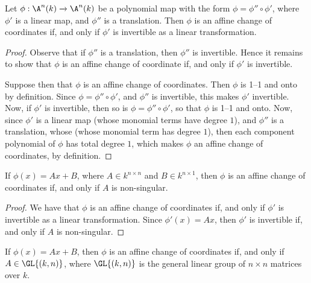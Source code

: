 \begin{lemma}\label{lemma_2.2.2}
  Let $\phi:\A^n(k) \xrightarrow{} \A^n(k)$ be a polynomial map with the form
  $\phi=\phi'' \circ \phi'$, where $\phi'$ is a linear map, and  $\phi''$ is a
  translation. Then $\phi$ is an affine change of coordinates if, and only if
  $\phi'$ is invertible as a linear transformation.
\end{lemma}
\begin{proof}
  Observe that if $\phi''$ is a translation, then $\phi''$ is invertible. Hence
  it remains to show that $\phi$ is an affine change of coordinate if, and only
  if $\phi'$ is invertible.

  Suppose then that $\phi$ is an affine change of coordinates. Then  $\phi$ is
  1--1 and onto by definition. Since $\phi=\phi'' \circ \phi'$, and $\phi''$ is
  invertible, this makes $\phi'$ invertible. Now, if $\phi'$ is invertible, then
  so is $\phi=\phi'' \circ \phi'$, so that $\phi$ is 1--1 and onto. Now, since
  $\phi'$ is a linear map  (whose monomial terms have degree $1$), and $\phi''$
  is a translation, whose (whose monomial term has degree $1$), then each
  component polynomial of $\phi$ has total degree $1$, which makes $\phi$ an
  affine change of coordinates, by definition.
\end{proof}
\begin{corollary}
  If $\phi(x)=Ax+B$, where $A \in k^{n \times n}$ and $B \in k^{n \times 1}$,
  then $\phi$ is an affine change of coordinates if, and only if $A$ is
  non-singular.
\end{corollary}
\begin{proof}
  We have that $\phi$ is an affine change of coordinates if, and only if $\phi'$
  is invertible as a linear transformation. Since $\phi'(x)=Ax$, then $\phi'$ is
  invertible if, and only if $A$ is non-singular.
\end{proof}
\begin{corollary}
  If $\phi(x)=Ax+B$, then $\phi$ is an affine change of coordinates if, and only
  if $A \in \GL{(k,n)}$, where $\GL{(k,n)}$ is the general linear group of $n
  \times n$ matrices over $k$.
\end{corollary}

